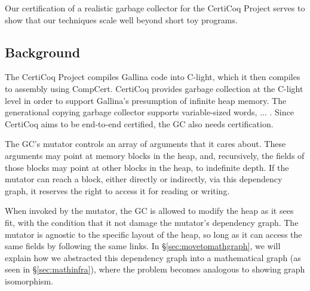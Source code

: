 Our certification of a realistic garbage collector for the 
CertiCoq Project serves to show that our techniques 
scale well beyond short toy programs. 


\subsection{Background}
\label{sec:gcbackground}

The CertiCoq Project compiles Gallina code into 
C-light, which it then compiles to assembly using CompCert.
CertiCoq provides garbage collection at
the C-light level in order to support Gallina's presumption of
infinite heap memory. The generational copying garbage 
collector {\color{magenta} supports variable-sized words, ... .}
Since CertiCoq aims to be end-to-end certified, the GC 
also needs certification.

The GC's mutator controls
an array of {\color{magenta}arguments} that it 
{\color{magenta}cares about}. 
These arguments may point at memory blocks 
in the heap, and, recursively, the fields of those
blocks may point at other blocks in the heap, to indefinite depth.
If the mutator {\color{magenta}can reach a block}, either directly
or indirectly, via this {\color{magenta}dependency graph}, 
it reserves the right to access it for reading or writing. 

When invoked by the mutator, the GC 
is allowed to modify the heap as
it sees fit, with the condition that it not damage the 
mutator's dependency graph. The mutator is agnostic 
to the specific layout of the heap, so long as 
it can access the same fields by following the same 
links.
In \S\ref{sec:movetomathgraph}, we will explain how we abstracted 
this dependency graph into a mathematical graph 
(as seen in \S\ref{sec:mathinfra}), where the problem becomes
analogous to showing graph isomorphism.

